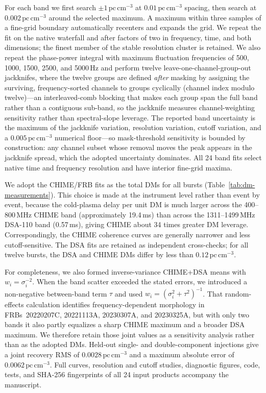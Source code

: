 For each band we first search $\pm1\,\mathrm{pc\,cm^{-3}}$ at
$0.01\,\mathrm{pc\,cm^{-3}}$ spacing, then search at
$0.002\,\mathrm{pc\,cm^{-3}}$ around the selected maximum. A maximum within
three samples of a fine-grid boundary automatically recenters and expands the
grid. We repeat the fit on the native waterfall and after factors of two in
frequency, time, and both dimensions; the finest member of the stable
resolution cluster is retained. We also repeat the phase-power integral with
maximum fluctuation frequencies of 500, 1000, 1500, 2500, and 5000\,Hz and
perform twelve leave-one-channel-group-out jackknifes, where the twelve
groups are defined \emph{after} masking by assigning the surviving,
frequency-sorted channels to groups cyclically (channel index modulo
twelve)---an interleaved-comb blocking that makes each group span the full
band rather than a contiguous sub-band, so the jackknife measures
channel-weighting sensitivity rather than spectral-slope leverage. The reported band
uncertainty is the maximum of the jackknife variation, resolution variation,
cutoff variation, and a $0.005\,\mathrm{pc\,cm^{-3}}$ numerical floor---so
mask-threshold sensitivity is bounded by construction: any channel subset
whose removal moves the peak appears in the jackknife spread, which the
adopted uncertainty dominates. All 24
band fits select native time and frequency resolution and have interior
fine-grid maxima.

We adopt the CHIME/FRB fits as the total DMs for all bursts
(Table~\ref{tab:dm-measurements}). This choice is made at the instrument level
rather than event by event, because the cold-plasma delay per unit DM is much
larger across the 400--800\,MHz CHIME band (approximately 19.4\,ms) than
across the 1311--1499\,MHz DSA-110 band (0.57\,ms), giving CHIME about 34
times greater DM leverage. Correspondingly, the CHIME coherence curves are
generally narrower and less cutoff-sensitive. The DSA fits are retained as
independent cross-checks; for all twelve bursts, the DSA and CHIME DMs differ
by less than $0.12\,\mathrm{pc\,cm^{-3}}$.

For completeness, we also formed inverse-variance CHIME+DSA means with
$w_i=\sigma_i^{-2}$. When the band scatter exceeded the stated errors, we
introduced a non-negative between-band term $\tau$ and used
$w_i=(\sigma_i^2+\tau^2)^{-1}$. That random-effects calculation identifies
frequency-dependent morphology in FRBs~20220207C, 20221113A, 20230307A, and
20230325A, but with only two bands it also partly equalizes a sharp CHIME
maximum and a broader DSA maximum. We therefore retain those joint values as a
sensitivity analysis rather than as the adopted DMs. Held-out single- and
double-component injections give a joint recovery RMS of
$0.0028\,\mathrm{pc\,cm^{-3}}$ and a maximum absolute error of
$0.0062\,\mathrm{pc\,cm^{-3}}$. Full curves, resolution and cutoff studies,
diagnostic figures, code, tests, and SHA-256 fingerprints of all 24 input
products accompany the manuscript.

